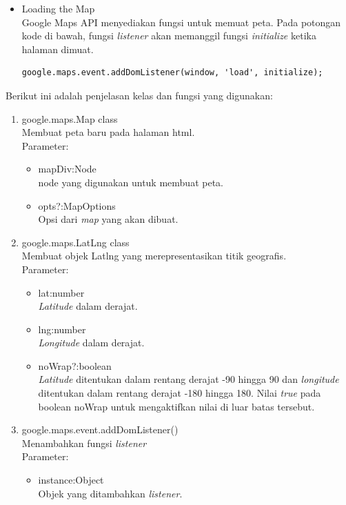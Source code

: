 \begin{itemize}
\item Loading the Map \\
Google Maps API menyediakan fungsi untuk memuat peta. Pada potongan kode
di bawah, fungsi \textit{listener} akan memanggil fungsi \textit{initialize}
ketika halaman dimuat.
\begin{verbatim}
google.maps.event.addDomListener(window, 'load', initialize);
\end{verbatim}
\end{itemize}
Berikut ini adalah penjelasan kelas dan fungsi yang digunakan:
\begin{enumerate}
  \item google.maps.Map class\\
  Membuat peta baru pada halaman html.\\
  Parameter:
  \begin{itemize}
    \item mapDiv:Node\\
    node yang digunakan untuk membuat peta.
    
    \item opts?:MapOptions\\
    Opsi dari \textit{map} yang akan dibuat. 
  \end{itemize}
  
  \item google.maps.LatLng class\\
  Membuat objek Latlng yang merepresentasikan titik geografis.\\
  Parameter:
  \begin{itemize}
    \item lat:number\\
    \textit{Latitude} dalam derajat.
    
    \item lng:number\\
    \textit{Longitude} dalam derajat.
    
    \item noWrap?:boolean\\
    \textit{Latitude} ditentukan dalam rentang derajat -90 hingga 90 dan
    \textit{longitude} ditentukan dalam rentang derajat -180 hingga 180. Nilai
    \textit{true} pada boolean noWrap untuk mengaktifkan nilai di luar
    batas tersebut.
  \end{itemize}
  
  \item google.maps.event.addDomListener()\\
  Menambahkan fungsi \textit{listener}\\
  Parameter:
  \begin{itemize}
    \item instance:Object\\
    Objek yang ditambahkan \textit{listener}.
    

\end{itemize}
\end{enumerate}
